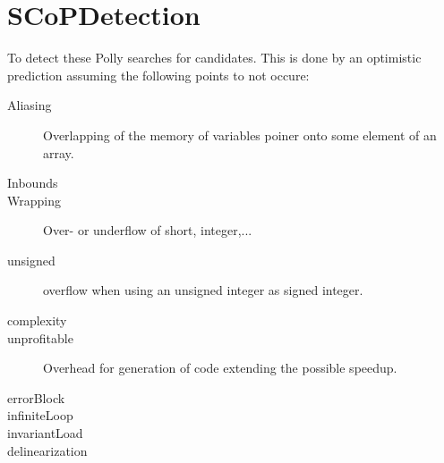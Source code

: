 \section{SCoPDetection}
To detect these \scops Polly searches for candidates.
This is done by an optimistic prediction  assuming the following points to not occure:
\begin{description}
    \item[Aliasing] Overlapping of the memory of variables \eg poiner onto some element of an array.
    \item[Inbounds] 
    \item[Wrapping] Over- or underflow of short, integer,...
    \item[unsigned] \Eg overflow when using an unsigned integer as signed integer.
    \item[complexity] 
    \item[unprofitable] Overhead for generation of code extending the possible speedup.
    \item[errorBlock]
    \item[infiniteLoop]
    \item[invariantLoad]
    \item[delinearization]
\end{description}

